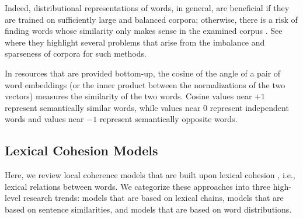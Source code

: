 Indeed, distributional representations of words, in general, are beneficial if they are trained on sufficiently large and balanced corpora; otherwise, there is a risk of finding words whose similarity only makes sense in the examined corpus \cite{lindekang98b}.  
See  where they highlight several problems that arise from the imbalance and sparseness of corpora for such methods. 

In resources that are provided bottom-up, the cosine of the angle of a pair of word embeddings (or the inner product between the normalizations of the two vectors) measures the similarity of the two words. 
Cosine values near $+1$ represent semantically similar words, while values near $0$ represent independent words and values near $-1$ represent semantically opposite words. 

\subsection{Lexical Cohesion Models}

Here, we review local coherence models that are built upon lexical cohesion \cite{halliday76}, i.e., lexical relations between words. 
We categorize these approaches into three high-level research trends: models that are based on lexical chains,  models that are based on sentence similarities, and models that are based on word distributions.  

